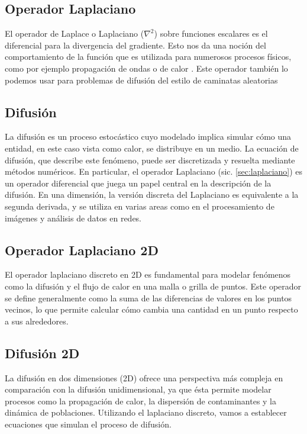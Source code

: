 \subsection{Operador Laplaciano}
\label{Intro_laplaciano}
\label{sec:laplaciano}

El operador de Laplace o Laplaciano ($\nabla^{2}$) sobre funciones escalares es el diferencial para la divergencia del gradiente. Esto nos da una noción del comportamiento de la función que es utilizada para numerosos procesos físicos, como por ejemplo propagación de ondas o de calor \cite{laplaciano_web}. Este operador también lo podemos usar para problemas de difusión del estilo de caminatas aleatorias \cite{random_walk}

\subsection{Difusión}
\label{Intro_difusion}

 La difusión es un proceso estocástico cuyo modelado implica simular cómo una entidad, en este caso vista como calor, se distribuye en un medio. La ecuación de difusión, que describe este fenómeno, puede ser discretizada y resuelta mediante métodos numéricos. En particular, el operador Laplaciano (sic. \ref{sec:laplaciano}) es un operador diferencial que juega un papel central en la descripción de la difusión. En una dimensión, la versión discreta del Laplaciano es equivalente a la segunda derivada, y se utiliza en varias areas como en el procesamiento de imágenes y análisis de datos en redes.


\subsection{Operador Laplaciano 2D}
\label{Intro_laplaciano2D}
El operador laplaciano discreto en 2D es fundamental para modelar fenómenos como la difusión y el flujo de calor en una malla o grilla de puntos. Este operador se define generalmente como la suma de las diferencias de valores en los puntos vecinos, lo que permite calcular cómo cambia una cantidad en un punto respecto a sus alrededores.

\subsection{Difusión 2D}
\label{Intro_difusion2D}
 La difusión en dos dimensiones (2D) ofrece una perspectiva más compleja en comparación con la difusión unidimensional, ya que ésta permite modelar procesos como la propagación de calor, la dispersión de contaminantes y la dinámica de poblaciones. Utilizando el laplaciano discreto, vamos a establecer ecuaciones que simulan el proceso de difusión.